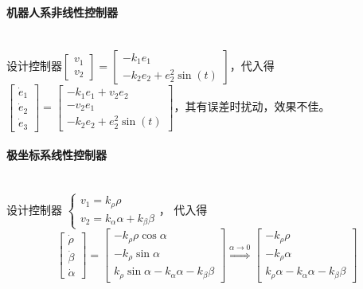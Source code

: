 \documentclass[
12pt, %
a4paper, 
oneside, %
headinclude,footinclude, %
]{scrartcl}
\begin{document}
\paragraph{机器人系非线性控制器}~\\

设计控制器$ \begin{bmatrix} v_1 \\ v_2 \end{bmatrix} = \begin{bmatrix} -k_1 e_1 \\ -k_2 e_2 + e_2^2 \sin(t) \end{bmatrix} $，代入得$ \begin{bmatrix} \dot{e}_1 \\ \dot{e}_2 \\ \dot{e}_3 \end{bmatrix} = \begin{bmatrix} -k_1 e_1 + v_2 e_2 \\ -v_2 e_1 \\ -k_2 e_2 + e_2^2 \sin(t) \end{bmatrix} $，其有误差时扰动，效果不佳。
\paragraph{极坐标系线性控制器}~\\

设计控制器%
$ 
\begin{cases}
v_1 = k_\rho \rho \\
v_2 = k_\alpha \alpha + k_\beta \beta
\end{cases}
$，%
代入得
$$ 
\begin{bmatrix} \dot{\rho} \\ \dot{\beta} \\ \dot{\alpha} \end{bmatrix} 
= \begin{bmatrix} -k_\rho \rho \cos\alpha \\ -k_\rho \sin\alpha \\ k_\rho \sin\alpha - k_\alpha \alpha - k_\beta \beta \end{bmatrix} 
\overset{\alpha \to 0}{\Longrightarrow}
\begin{bmatrix} -k_\rho \rho \\ -k_\rho \alpha \\ k_\rho \alpha - k_\alpha \alpha - k_\beta \beta \end{bmatrix} 
$$
\end{document}
